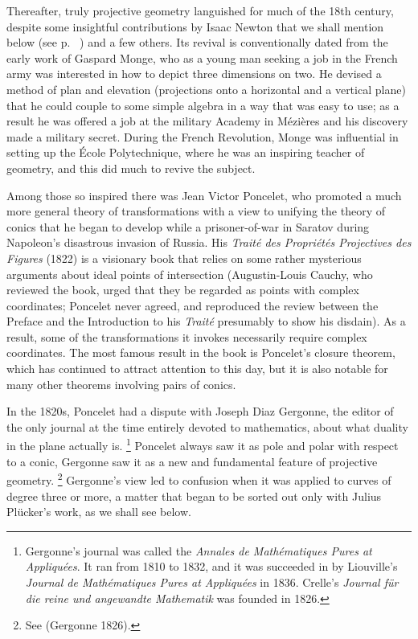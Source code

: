 Thereafter, truly projective geometry languished for much of the 18th
century, despite some insightful contributions by Isaac Newton that we
shall mention below (see p. ~\pageref{Newtonconics}) and a few others. Its
revival is conventionally dated from the early work of Gaspard Monge,
who as a young man seeking a job in the French army was  interested in
how to depict three dimensions on two. He devised a method of plan and
elevation (projections onto a horizontal and a vertical plane) that he
could couple to some simple algebra in a way that was easy to use; as a
result he was offered a job at the military Academy in M\'ezi\`eres and
his discovery made a military secret. During the French Revolution, Monge
was influential in setting up the \'Ecole Polytechnique, where he was
an inspiring teacher of geometry, and this did much to revive the subject.

Among those so inspired there was Jean Victor Poncelet, who promoted
a much more general theory of transformations with a view to unifying
the theory of conics that he began to develop while a prisoner-of-war
in Saratov during Napoleon's disastrous invasion of Russia. His
\emph{Trait\'e des Propri\'et\'es Projectives des Figures} (1822) is a
visionary book that relies on some rather mysterious arguments about ideal
points of intersection (Augustin-Louis Cauchy, who reviewed the book,
urged that they be regarded as points with complex coordinates; Poncelet
never agreed, and reproduced the review between the Preface and the
Introduction to his \emph{Trait\'e}  presumably to show his disdain). As
a result, some of the transformations it invokes necessarily require
complex coordinates. The most famous result in the book is Poncelet's
closure theorem, which has continued to attract attention to this day,
but it is also notable for many other theorems involving pairs of conics.


In the 1820s, Poncelet had a dispute with Joseph Diaz Gergonne, the editor
of the only journal at the time entirely devoted to mathematics, about
what duality in the plane actually is.%
%
\footnote{Gergonne's journal was
called the \emph{Annales de Math\'ematiques Pures at Appliqu\'ees}. It ran
from 1810 to 1832, and  it was succeeded in by Liouville's \emph{Journal
de Math\'ematiques Pures at Appliqu\'ees} in 1836. Crelle's \emph{Journal
f\"ur die reine und angewandte Mathematik} was founded in 1826.}
%
Poncelet always saw it as pole and polar with respect to a conic,
Gergonne saw it as a new and fundamental feature of projective
geometry.%
%
\footnote{See (Gergonne 1826).} 
%
Gergonne's view led to confusion
when it was applied to curves of degree three or more, a matter that began
to be sorted out only with Julius Pl\"ucker's work, as we shall see below.


